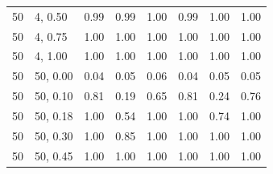 \begin{table}[p]
{\begin{tabular}{llcccccc}
50 & 4, 0.50 & 0.99 & 0.99 & 1.00 & 0.99 & 1.00 & 1.00 \\
50 & 4, 0.75 & 1.00 & 1.00 & 1.00 & 1.00 & 1.00 & 1.00 \\
50 & 4, 1.00 & 1.00 & 1.00 & 1.00 & 1.00 & 1.00 & 1.00 \\
50 & 50, 0.00 & 0.04 & 0.05 & 0.06 & 0.04 & 0.05 & 0.05 \\
50 & 50, 0.10 & 0.81 & 0.19 & 0.65 & 0.81 & 0.24 & 0.76 \\
50 & 50, 0.18 & 1.00 & 0.54 & 1.00 & 1.00 & 0.74 & 1.00 \\
50 & 50, 0.30 & 1.00 & 0.85 & 1.00 & 1.00 & 1.00 & 1.00 \\
50 & 50, 0.45 & 1.00 & 1.00 & 1.00 & 1.00 & 1.00 & 1.00 \\
\bottomrule
\end{tabular}}
\end{table}
\clearpage
\begin{table}[p]
\centering
\caption{AR(1) correlation 0.5. Rejection rate at $\alpha=0.05$. Each row is one covariate-shift cell. The six statistics share the kernel, the bandwidth, and the permutations.}
\end{table}
\clearpage
